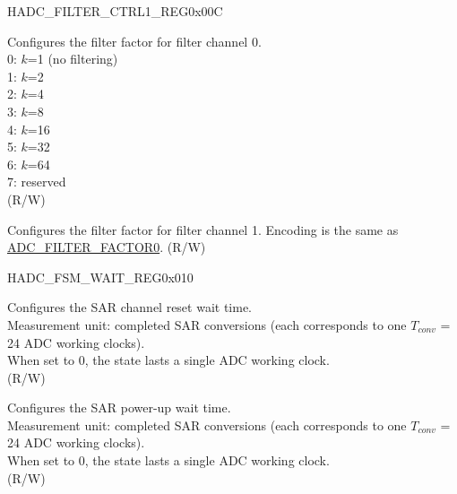 \begin{register}{H}{ADC\_FILTER\_CTRL1\_REG}{0x00C}\label{regdesc:ADCFILTERCTRL1REG}
%
%
%
\regnewline%
\begin{regdesc}\begin{reglist}
\label{fielddesc:ADCFILTERFACTOR0}\item [ADC\_FILTER\_FACTOR0] Configures the filter factor for filter channel 0.\\
0: $k$=1 (no filtering)\\
1: $k$=2\\
2: $k$=4\\
3: $k$=8\\
4: $k$=16\\
5: $k$=32\\
6: $k$=64\\
7: reserved\\
(R/W)
\label{fielddesc:ADCFILTERFACTOR1}\item [ADC\_FILTER\_FACTOR1] Configures the filter factor for filter channel 1. Encoding is the same as \hyperref[fielddesc:ADCFILTERFACTOR0]{ADC\_FILTER\_FACTOR0}. (R/W)
\end{reglist}\end{regdesc}
\end{register}


\begin{register}{H}{ADC\_FSM\_WAIT\_REG}{0x010}\label{regdesc:ADCFSMWAITREG}
%
%
%
\regnewline%
\begin{regdesc}\begin{reglist}
\label{fielddesc:ADCRSTBWAIT}\item [ADC\_RSTB\_WAIT] Configures the SAR channel reset wait time.\\
Measurement unit: completed SAR conversions (each corresponds to one $T_{conv}$ = 24 ADC working clocks).\\
When set to 0, the state lasts a single ADC working clock.\\
(R/W)
\label{fielddesc:ADCXPDWAIT}\item [ADC\_XPD\_WAIT] Configures the SAR power-up wait time.\\
Measurement unit: completed SAR conversions (each corresponds to one $T_{conv}$ = 24 ADC working clocks).\\
When set to 0, the state lasts a single ADC working clock.\\
(R/W)
\end{reglist}\end{regdesc}
\end{register}


